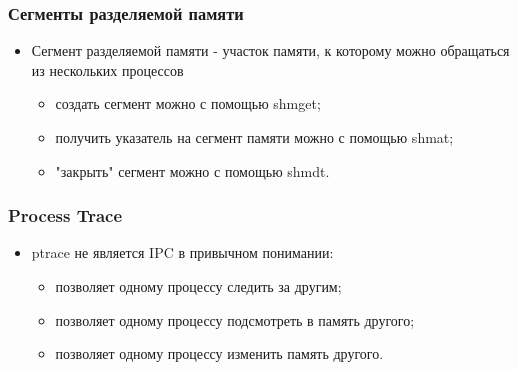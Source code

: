 \begin{frame}
\frametitle{Сегменты разделяемой памяти}
\begin{itemize}
    \item<1->Сегмент разделяемой памяти - участок памяти, к которому можно
         обращаться из нескольких процессов
    \begin{itemize}
        \item<2->создать сегмент можно с помощью shmget;
        \item<3->получить указатель на сегмент памяти можно с помощью shmat;
        \item<4->"закрыть" сегмент можно с помощью shmdt.
    \end{itemize}
\end{itemize}
\end{frame}

\begin{frame}
\frametitle{Process Trace}
\begin{itemize}
    \item<1->ptrace не является IPC в привычном понимании:
    \begin{itemize}
        \item<2->позволяет одному процессу следить за другим;
        \item<3->позволяет одному процессу подсмотреть в память другого;
        \item<4->позволяет одному процессу изменить память другого.
    \end{itemize}
\end{itemize}
\end{frame}

